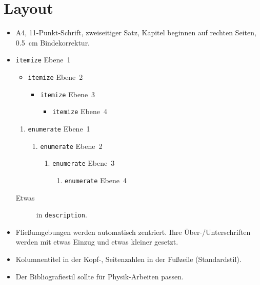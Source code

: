 \section{Layout}
\begin{itemize}
  \item A4, 11-Punkt-Schrift, zweiseitiger Satz, Kapitel beginnen auf rechten Seiten, \SI{0.5}{\centi\meter} Bindekorrektur.

  \item \texttt{itemize} Ebene~1
    \begin{itemize}
      \item \texttt{itemize} Ebene~2
        \begin{itemize}
          \item \texttt{itemize} Ebene~3
            \begin{itemize}
              \item \texttt{itemize} Ebene~4
            \end{itemize}
        \end{itemize}
    \end{itemize}
    \begin{enumerate}
      \item \texttt{enumerate} Ebene~1
        \begin{enumerate}
          \item \texttt{enumerate} Ebene~2
            \begin{enumerate}
              \item \texttt{enumerate} Ebene~3
                \begin{enumerate}
                  \item \texttt{enumerate} Ebene~4
                \end{enumerate}
            \end{enumerate}
        \end{enumerate}
    \end{enumerate}
    \begin{description}
      \item[Etwas] in \texttt{description}.
    \end{description}

  \item Fließumgebungen werden automatisch zentriert.
    Ihre Über-/Unterschriften werden mit etwas Einzug und etwas kleiner gesetzt.

  \item Kolumnentitel in der Kopf-, Seitenzahlen in der Fußzeile (Standardstil).

  \item Der Bibliografiestil sollte für Physik-Arbeiten passen.
\end{itemize}

